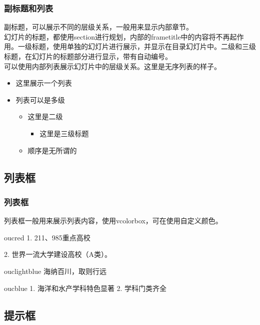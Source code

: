 \documentclass[aspectratio=169,UTF8,t]{beamer}%
\begin{document}
\begin{frame}
    \frametitle{副标题和列表}
    副标题，可以展示不同的层级关系，一般用来显示内部章节。\\
    幻灯片的标题，都使用section进行规划，内部的frametitle中的内容将不再起作用。一级标题，使用单独的幻灯片进行展示，并显示在目录幻灯片中。二级和三级标题，在幻灯片的标题部分进行显示，带有自动编号。\\
    可以使用内部列表展示幻灯片中的层级关系。这里是无序列表的样子。
    \begin{itemize}
        \item 这里展示一个列表 
        \item 列表可以是多级
        \begin{itemize}
            \item 这里是二级
            \begin{itemize}
                \item 这里是三级标题
            \end{itemize}
            \item 顺序是无所谓的
        \end{itemize}
    \end{itemize}
\end{frame}

\subsection{列表框}

\begin{frame}
    \frametitle{列表框}
    列表框一般用来展示列表内容，使用vcolorbox，可在使用自定义颜色。
    \begin{vcolorbox}[中国海洋大学]{oucred}
        1. 211、985重点高校

        2. 世界一流大学建设高校（A类）。
    \end{vcolorbox}
    \begin{vcolorbox}[学校校训]{ouclightblue}
        海纳百川，取则行远
    \end{vcolorbox}
    \begin{vcolorbox}[学校特色]{oucblue}
        1. 海洋和水产学科特色显著
        2. 学科门类齐全
    \end{vcolorbox}
\end{frame}

\subsection{提示框}
\end{document}

